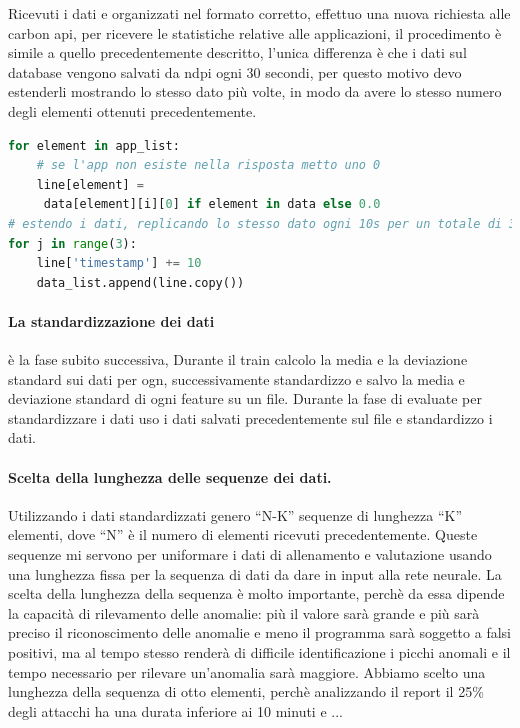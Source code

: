 Ricevuti i dati e organizzati nel formato corretto, effettuo una nuova richiesta alle carbon api, per ricevere le statistiche relative alle applicazioni, il procedimento è simile a quello precedentemente descritto, l'unica differenza è che i dati sul database vengono salvati da ndpi ogni 30 secondi, per questo motivo devo estenderli mostrando lo stesso dato più volte, in modo da avere lo stesso numero degli elementi ottenuti precedentemente.

\begin{lstlisting}[language=Python]
for element in app_list:
    # se l'app non esiste nella risposta metto uno 0
    line[element] =
     data[element][i][0] if element in data else 0.0
# estendo i dati, replicando lo stesso dato ogni 10s per un totale di 30s
for j in range(3):
    line['timestamp'] += 10
    data_list.append(line.copy())
\end{lstlisting}


\paragraph{La standardizzazione dei dati} è la fase subito successiva, 
Durante il train calcolo la media e la deviazione standard sui dati per ogn, successivamente standardizzo e salvo la media e deviazione standard di ogni feature su un file.
Durante la fase di evaluate per standardizzare i dati uso i dati salvati precedentemente sul file e standardizzo i dati.

\paragraph{Scelta della lunghezza delle sequenze dei dati.} Utilizzando i dati standardizzati genero ``N-K'' sequenze di lunghezza ``K'' elementi, dove ``N'' è il numero di elementi ricevuti precedentemente. Queste sequenze mi servono per uniformare i dati di allenamento e valutazione usando una lunghezza fissa per la sequenza di dati da dare in input alla rete neurale.
La scelta della lunghezza della sequenza è molto importante, perchè da essa dipende la capacità di rilevamento delle anomalie: più il valore sarà grande e più sarà preciso il riconoscimento delle anomalie e meno il programma sarà soggetto a falsi positivi, ma al tempo stesso renderà di difficile identificazione i picchi anomali e il tempo necessario per rilevare un'anomalia sarà maggiore.
Abbiamo scelto una lunghezza della sequenza di otto elementi, perchè analizzando il report \cite{imperva_ddos_report} il 25\% degli attacchi ha una durata inferiore ai 10 minuti e ...


